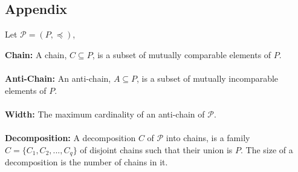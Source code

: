 \documentclass[addpoints]{exam}
\begin{document}
\begin{questions}
\appendix

\section{Appendix}
Let $\mathcal{P}= (P, \preccurlyeq)$,

\textbf{Chain:} A chain, $C\subseteq P$, is a subset of mutually comparable elements of $P$.\\\\
\textbf{Anti-Chain:} An anti-chain, $A \subseteq P$, is a subset of mutually incomparable elements of $P$.\\\\
\textbf{Width:} The maximum cardinality of an anti-chain of $\mathcal{P}$.\\\\
\textbf{Decomposition:} A decomposition $C$ of $\mathcal{P}$ into chains, is a family $C = \{C_1,C_2,...,C_q\}$ of disjoint chains such that their union is $P$. The size of a decomposition is the number of chains in it.










\end{questions}
\end{document}

